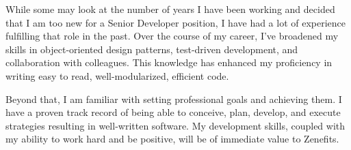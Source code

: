 While some may look at the number of years I have been working and decided that I am too new for a Senior Developer position, I have had a lot of experience fulfilling that role in the past.  Over the course of my career, I’ve broadened my skills in object-oriented design patterns, test-driven development, and collaboration with colleagues. This knowledge has enhanced my proficiency in writing easy to read, well-modularized, efficient code.

Beyond that, I am familiar with setting professional goals and achieving them. I have a proven track record of being able to conceive, plan, develop, and execute strategies resulting in well-written software. My development skills, coupled with my ability to work hard and be positive, will be of immediate value to Zenefits.